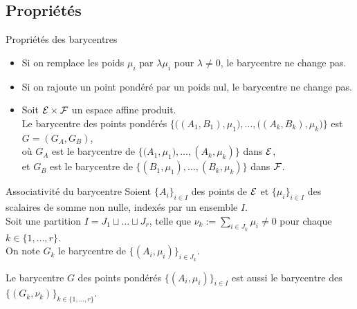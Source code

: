 \documentclass[
bigger]{m53beamer}
\begin{document}
\subsection{Propriétés}
  \begin{frame}{Propriétés des barycentres}
    \begin{itemize}[<+(1)->]
      \item Si on remplace les poids $\mu_{i}$ par $\lambda\mu_{i}$ pour $\lambda \neq 0$, le barycentre ne change pas.
      \item Si on rajoute un point pondéré par un poids nul, le barycentre ne change pas.
      \item Soit $\mathcal{E} \times \mathcal{F}$ un espace affine produit.\\
      Le barycentre des points pondérés $\{\big((A_{1},B_{1}),\mu_{1}\big),\ldots,\big((A_{k},B_{k}),\mu_{k}\big)\}$ est $G=(G_{A},G_{B})$,\\
      où $G_{A}$ est le barycentre de $\{(A_{1},\mu_{1}\big),\ldots,(A_{k},\mu_{k})\}$ dans $\mathcal{E}$,\\
      et $G_{B}$ est le barycentre de $\{(B_{1},\mu_{1}),\ldots,(B_{k},\mu_{k})\}$ dans $\mathcal{F}$.
    \end{itemize}
  \end{frame}
  \begin{frame}{Associativité du barycentre}
    Soient $\{A_{i}\}_{i \in I}$ des points de $\mathcal{E}$ et $\{\mu_{i}\}_{i \in I}$ des scalaires de somme non nulle, indexés par un  ensemble $I$.\pause\\
    Soit une partition $I =J_{1} \sqcup\dots\sqcup J_{r}$, telle que $\nu_{k}:=\sum_{i \in J_{k}}\mu_{i} \neq 0$ pour chaque $k \in \{1,\ldots,r\}$.\pause\\
    On note $G_{k}$ le barycentre de $\{(A_{i},\mu_{i})\}_{i \in J_{k}}$.\pause
    \begin{proposition}
      Le barycentre $G$ des points pondérés $\{(A_{i},\mu_{i})\}_{i \in I}$ est aussi le barycentre des $\{(G_{k},\nu_{k})\}_{k \in \{1,\ldots,r\}}$.
    \end{proposition}
  \end{frame}
\end{document}

